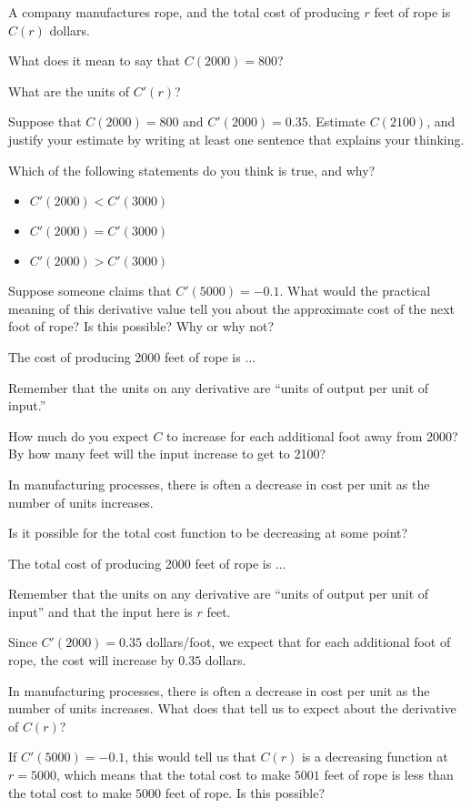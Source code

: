 \begin{activity} \label{A:1.5.2}
A company manufactures rope, and the total cost of producing $r$ feet of rope is $C(r)$ dollars.
\ba
	\item What does it mean to say that $C(2000) = 800$?

	\item What are the units of $C'(r)$?

	\item Suppose that $C(2000) = 800$ and $C'(2000) = 0.35$.  Estimate $C(2100)$, and justify your estimate by writing at least one sentence that explains your thinking.

	\item Which of the following statements do you think is true, and why?
	\begin{itemize}
		\item $C'(2000) < C'(3000)$
		\item $C'(2000) = C'(3000)$
		\item $C'(2000) > C'(3000)$
	\end{itemize}

	\item Suppose someone claims that $C'(5000) = -0.1$.  What would the practical meaning of this derivative value tell you about the approximate cost of the next foot of rope?  Is this possible?  Why or why not?  
\ea
\end{activity}
\begin{smallhint}
\ba
	\item The cost of producing 2000 feet of rope is $\ldots$
	\item Remember that the units on any derivative are ``units of output per unit of input.''
	\item How much do you expect $C$ to increase for each additional foot away from 2000?  By how many feet will the input increase to get to 2100?
	\item In manufacturing processes, there is often a decrease in cost per unit as the number of units increases.
	\item Is it possible for the total cost function to be decreasing at some point?
\ea
\end{smallhint}
\begin{bighint}
\ba
	\item The total cost of producing 2000 feet of rope is $\ldots$
	\item Remember that the units on any derivative are ``units of output per unit of input'' and that the input here is $r$ feet.
	\item Since $C'(2000) = 0.35$ dollars/foot, we expect that for each additional foot of rope, the cost will increase by $0.35$ dollars.
	\item In manufacturing processes, there is often a decrease in cost per unit as the number of units increases.  What does that tell us to expect about the derivative of $C(r)$?
	\item If $C'(5000) = -0.1$, this would tell us that $C(r)$ is a decreasing function at $r = 5000$, which means that the total cost to make $5001$ feet of rope is less than the total cost to make $5000$ feet of rope.  Is this possible?
\ea
\end{bighint}
